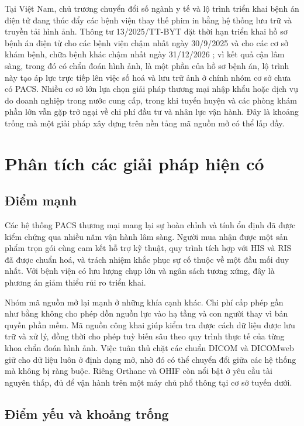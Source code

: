 Tại Việt Nam, chủ trương chuyển đổi số ngành y tế và lộ trình triển khai bệnh án
điện tử đang thúc đẩy các bệnh viện thay thế phim in bằng hệ thống lưu trữ và
truyền tải hình ảnh. Thông tư 13/2025/TT-BYT đặt thời hạn triển khai hồ sơ bệnh án
điện tử cho các bệnh viện chậm nhất ngày 30/9/2025 và cho các cơ sở khám bệnh, chữa
bệnh khác chậm nhất ngày 31/12/2026 \cite{tt13_2025}; vì kết quả cận lâm sàng, trong
đó có chẩn đoán hình ảnh, là một phần của hồ sơ bệnh án, lộ trình này tạo áp lực
trực tiếp lên việc số hoá và lưu trữ ảnh ở chính nhóm cơ sở chưa có PACS. Nhiều cơ sở lớn lựa chọn giải pháp thương mại nhập khẩu
hoặc dịch vụ do doanh nghiệp trong nước cung cấp, trong khi tuyến huyện và các
phòng khám phần lớn vẫn gặp trở ngại về chi phí đầu tư và nhân lực vận hành. Đây
là khoảng trống mà một giải pháp xây dựng trên nền tảng mã nguồn mở có thể lấp
đầy.

\section{Phân tích các giải pháp hiện có}
\label{sec:solutions-analysis}

\subsection{Điểm mạnh}

Các hệ thống PACS thương mại mang lại sự hoàn chỉnh và tính ổn định đã được kiểm
chứng qua nhiều năm vận hành lâm sàng. Người mua nhận được một sản phẩm trọn gói
cùng cam kết hỗ trợ kỹ thuật, quy trình tích hợp với HIS và RIS đã được chuẩn
hoá, và trách nhiệm khắc phục sự cố thuộc về một đầu mối duy nhất. Với bệnh viện
có lưu lượng chụp lớn và ngân sách tương xứng, đây là phương án giảm thiểu rủi ro
triển khai.

Nhóm mã nguồn mở lại mạnh ở những khía cạnh khác. Chi phí cấp phép gần như bằng
không cho phép dồn nguồn lực vào hạ tầng và con người thay vì bản quyền phần mềm.
Mã nguồn công khai giúp kiểm tra được cách dữ liệu được lưu trữ và xử lý, đồng
thời cho phép tuỳ biến sâu theo quy trình thực tế của từng khoa chẩn đoán hình
ảnh. Việc tuân thủ chặt các chuẩn DICOM và DICOMweb giữ cho dữ liệu luôn ở định
dạng mở, nhờ đó có thể chuyển đổi giữa các hệ thống mà không bị ràng buộc. Riêng
Orthanc và OHIF còn nổi bật ở yêu cầu tài nguyên thấp, đủ để vận hành trên một
máy chủ phổ thông tại cơ sở tuyến dưới.

\subsection{Điểm yếu và khoảng trống}

